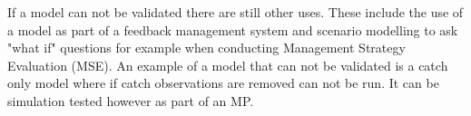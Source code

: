 \documentclass[12pt,halfline,a4paper,nonumbib]{ouparticle}
\newcommand{\todo}{\textcolor{red}}
\begin{document}
If a model can not be validated there are still other uses. These include the use of a  model as part of a feedback management system and  scenario modelling to ask "what if" questions for example when conducting Management Strategy Evaluation (MSE). An example of a model that can not be validated is a catch only model where if catch observations are removed can not be run. It can be simulation tested however as part of an MP. %



  
\end{document}
